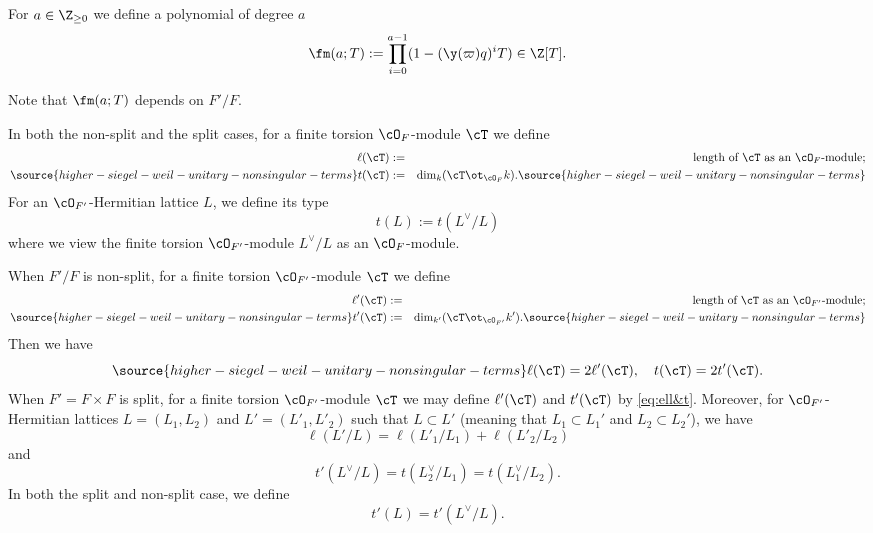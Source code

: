 \begin{defn}
\notready\label{def:maT}
For $a\in \Z_{\ge0}$ we define  a polynomial of degree $a$
\begin{equation*}
\fm(a; T) := \prod_{i=0}^{a-1}(1-(\y(\varpi)q)^i T) \in \Z[T].
\end{equation*}
\end{defn}
Note that $\fm(a; T)$ depends on $F'/F$.

In both the non-split and the split cases, for a finite torsion $\cO_{F}$-module $\cT$ we define
\begin{eqnarray*}
\label{def ell}\ell(\cT)&:=&\mbox{ length of $\cT$ as an $\cO_{F}$-module};\\
\source{higher-siegel-weil-unitary-nonsingular-terms}
\label{def t} t(\cT)&:=&\dim_{k}(\cT\ot_{\cO_{F}}k).
\source{higher-siegel-weil-unitary-nonsingular-terms}
\end{eqnarray*}
For an $\cO_{F'}$-Hermitian lattice $L$, we define its type
$$
t(L):=t(L^\vee/L)
$$
where we view the finite torsion $\cO_{F'}$-module $L^\vee/L$ as an $\cO_{F}$-module.


When $F'/F$ is non-split, for a finite torsion $\cO_{F'}$-module $\cT$ we define
\begin{eqnarray*}
\label{def ell'}\ell'(\cT)&:=&\mbox{length of $\cT$ as an $\cO_{F'}$-module};\\
\source{higher-siegel-weil-unitary-nonsingular-terms}
\label{def t'}t'(\cT)&:=&\dim_{k'}(\cT\ot_{\cO_{F'}}k').
\source{higher-siegel-weil-unitary-nonsingular-terms}
\end{eqnarray*}
 Then we have
\begin{equation}\label{eq:ell&t}
\source{higher-siegel-weil-unitary-nonsingular-terms}
\ell(\cT)=2\ell'(\cT),\quad t(\cT)=2t'(\cT).
\end{equation}
When $F'=F\times F$ is split, for a finite torsion $\cO_{F'}$-module $\cT$ we may define $\ell'(\cT)$ and $t'(\cT)$ by \eqref{eq:ell&t}. Moreover, for  $\cO_{F'}$-Hermitian lattices $L=(L_1,L_2)$ and $L'=(L'_1,L'_2)$ such that $L\subset L'$ (meaning that $L_1 \subset L_1'$ and $L_2 \subset L_2'$), we have
$$
\ell(L'/L)=\ell(L'_1/L_1)+\ell(L'_2/L_2)
$$
and
$$
t'(L^\vee/L)=t(L_2^{\vee}/L_1)=t(L_1^{\vee}/L_2).
$$
In both the split and non-split case, we define
$$
t'(L)=t'(L^\vee/L).
$$


